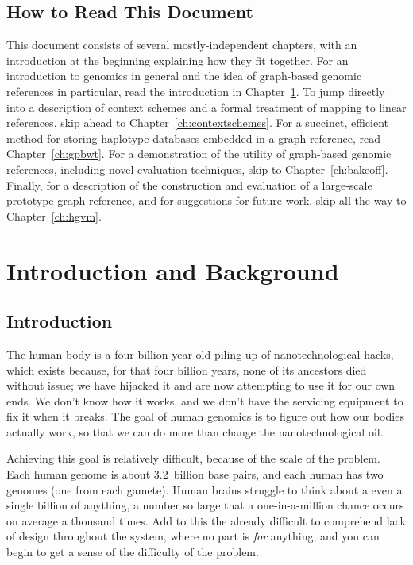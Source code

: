 \section*{How to Read This Document}

This document consists of several mostly-independent chapters, with an introduction at the beginning explaining how they fit together. For an introduction to genomics in general and the idea of graph-based genomic references in particular, read the introduction in Chapter~\ref{ch:intro}. To jump directly into a description of context schemes and a formal treatment of mapping to linear references, skip ahead to Chapter~\ref{ch:contextschemes}. For a succinct, efficient method for storing haplotype databases embedded in a graph reference, read Chapter~\ref{ch:gpbwt}. For a demonstration of the utility of graph-based genomic references, including novel evaluation techniques, skip to Chapter~\ref{ch:bakeoff}. Finally, for a description of the construction and evaluation of a large-scale prototype graph reference, and for suggestions for future work, skip all the way to Chapter~\ref{ch:hgvm}. 


\chapter{Introduction and Background}
\label{ch:intro}

\section{Introduction}

The human body is a four-billion-year-old piling-up of nanotechnological hacks, which exists because, for that four billion years, none of its ancestors died without issue; we have hijacked it and are now attempting to use it for our own ends. We don't know how it works, and we don't have the servicing equipment to fix it when it breaks. The goal of human genomics is to figure out how our bodies actually work, so that we can do more than change the nanotechnological oil.

Achieving this goal is relatively difficult, because of the scale of the problem. Each human genome is about 3.2~billion base pairs, and each human has two genomes (one from each gamete). %
Human brains struggle to think about a even a single billion of anything, a number so large that a one-in-a-million chance occurs on average a thousand times. Add to this the already difficult to comprehend lack of design throughout the system, where no part is \textit{for} anything, and you can begin to get a sense of the difficulty of the problem.

